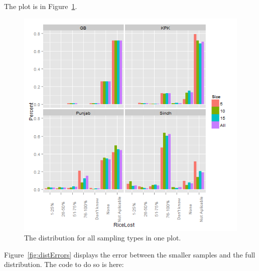 The plot is in Figure~\ref{fig:allDistInOne}.
\begin{figure}[!hbtp]
\begin{knitrout}
\color{fgcolor}

{\centering \includegraphics[width=.9\linewidth]{smallerDist/figures/allDistInOnePlot} 

}


\end{knitrout}

\caption{The distribution for all sampling types in one plot.\label{fig:allDistInOne}}
\end{figure}

Figure~\ref{fig:distErrors} displays the error between the smaller samples and the full distribution.  The code to do so is here:

